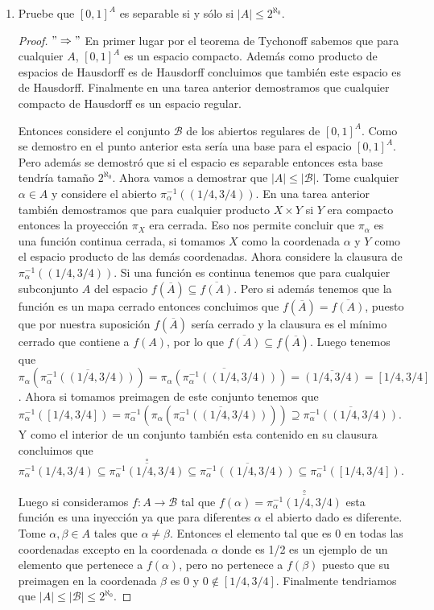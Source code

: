 \documentclass[paper=letter, fontsize=11pt]{scrartcl} %
\numberwithin{equation}{section} %
\numberwithin{figure}{section} %
\numberwithin{table}{section} %
\begin{document}
\begin{enumerate}
\item Pruebe que $ [0,1]^A $ es separable si y sólo si $ |A|\leq 2^{\aleph_0} $.
\begin{proof}

$ "\Rightarrow" $ En primer lugar por el teorema de Tychonoff sabemos que para cualquier $ A $, $ [0,1]^A $ es un espacio compacto. Además como producto de espacios de Hausdorff es de Hausdorff concluimos que también este espacio es de Hausdorff. Finalmente en una tarea anterior demostramos que cualquier compacto de Hausdorff es un espacio regular.

Entonces considere el conjunto $ \mathcal{B} $ de los abiertos regulares de $ [0,1]^A $. Como se demostro en el punto anterior esta sería una base para el espacio $ [0,1]^A $. Pero además se demostró que si el espacio es separable entonces esta base tendría tamaño $ 2^{\aleph_0} $. Ahora vamos a demostrar que $ |A| \leq |\mathcal{B}| $. Tome cualquier $ \alpha \in A $ y considere el abierto $ \pi^{-1}_\alpha((1/4,3/4)) $.
En una tarea anterior también demostramos que para cualquier producto $ X \times Y $ si  $ Y $ era compacto entonces la proyección $ \pi_X $ era cerrada. Eso nos permite concluir que $ \pi_\alpha $ es una función continua cerrada, si tomamos $ X $ como la coordenada $ \alpha $ y $ Y $ como el espacio producto de las demás coordenadas.
Ahora considere la clausura de $ \pi^{-1}_\alpha((1/4,3/4)) $.
Si una función es continua tenemos que para cualquier subconjunto $ A $ del espacio $ f(\overline{A}) \subseteq \overline{f(A)} $. Pero si además tenemos que la función es un mapa cerrado entonces concluimos que $ f(\overline{A})=\overline{f(A)} $, puesto que por nuestra suposición $ f(\overline{A}) $ sería cerrado y la clausura es el mínimo cerrado que contiene a $ f(A) $, por lo que $ \overline{f(A)} \subseteq f(\overline{A}) $.
Luego tenemos que $\pi_\alpha(\overline{\pi^{-1}_\alpha((1/4,3/4))}) = \overline{\pi_\alpha(\pi_\alpha^{-1}((1/4,3/4)))}= \overline{(1/4,3/4)} = [1/4,3/4] $.
Ahora si tomamos preimagen de este conjunto tenemos que
 $ \pi_\alpha^{-1}([1/4,3/4]) = \pi_\alpha^{-1}(\pi_\alpha(\overline{\pi^{-1}_\alpha((1/4,3/4))})) \supseteq \overline{\pi^{-1}_\alpha((1/4,3/4))} $.
Y como el interior de un conjunto también esta contenido en su clausura concluimos que $ \pi_\alpha^{-1}(1/4,3/4) \subseteq \overset{\circ}{\overline{\pi_\alpha^{-1}(1/4,3/4)}} \subseteq \overline{\pi^{-1}_\alpha((1/4,3/4))} \subseteq \pi_\alpha^{-1}([1/4,3/4]) $.

Luego si consideramos $ f: A \to \mathcal{B} $ tal que $ f(\alpha) = \overset{\circ}{\overline{\pi_\alpha^{-1}(1/4,3/4)}} $ esta función es una inyección ya que para diferentes $ \alpha $ el abierto dado es diferente. Tome $ \alpha, \beta \in A $ tales que $ \alpha \not = \beta $. Entonces el elemento tal que es $ 0 $ en todas las coordenadas excepto en la coordenada $ \alpha $ donde es 1/2 es un ejemplo de un elemento que pertenece a $ f(\alpha) $, pero no pertenece a $ f(\beta) $ puesto que su preimagen en la coordenada $ \beta $ es 0 y $ 0 \not \in [1/4,3/4] $.
Finalmente tendriamos que $ |A|\leq |\mathcal{B}|\leq 2^{\aleph_0} $.


\end{proof}
\end{enumerate}
\end{document}
